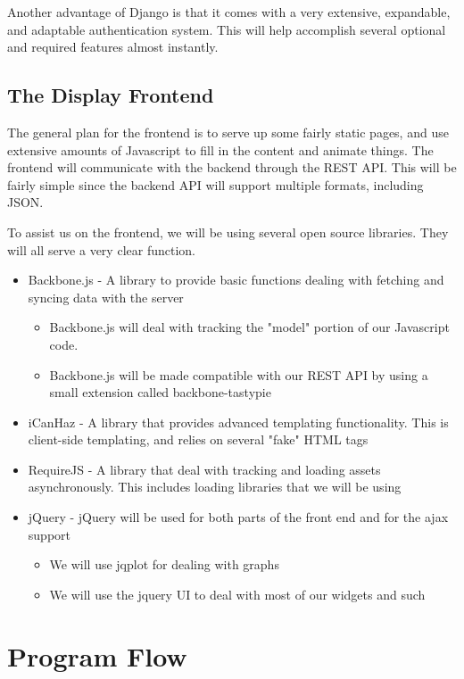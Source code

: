 Another advantage of Django is that it comes with a very extensive, expandable, and adaptable authentication system.
This will help accomplish several optional and required features almost instantly.


\subsection{The Display Frontend}

The general plan for the frontend is to serve up some fairly static pages, and use extensive amounts of Javascript to fill in the content and animate things.
The frontend will communicate with the backend through the REST API.
This will be fairly simple since the backend API will support multiple formats, including JSON.

To assist us on the frontend, we will be using several open source libraries.
They will all serve a very clear function.

\begin{itemize}
 \item Backbone.js - A library to provide basic functions dealing with fetching and syncing data with the server
 \begin{itemize}
  \item Backbone.js will deal with tracking the "model" portion of our Javascript code.
  \item Backbone.js will be made compatible with our REST API by using a small extension called backbone-tastypie
 \end{itemize}
 \item iCanHaz - A library that provides advanced templating functionality.
This is client-side templating, and relies on several "fake" HTML tags
 \item RequireJS - A library that deal with tracking and loading assets asynchronously.
This includes loading libraries that we will be using
 \item jQuery - jQuery will be used for both parts of the front end and for the ajax support
 \begin{itemize}
  \item We will use jqplot for dealing with graphs
  \item We will use the jquery UI to deal with most of our widgets and such
 \end{itemize}
\end{itemize}

\section{Program Flow}

